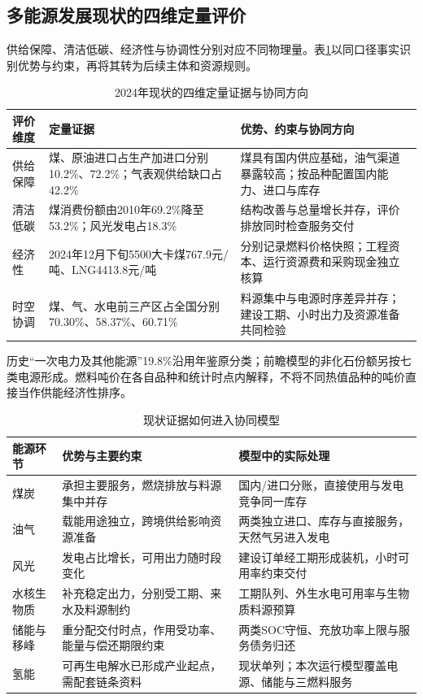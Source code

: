 \subsection{多能源发展现状的四维定量评价}
供给保障、清洁低碳、经济性与协调性分别对应不同物理量。表\ref{tab:current-four}以同口径事实识别优势与约束，再将其转为后续主体和资源规则。
\begin{table}[H]\centering\caption{2024年现状的四维定量证据与协同方向}\label{tab:current-four}
\begin{tabularx}{\linewidth}{p{.14\linewidth}p{.42\linewidth}X}\toprule
评价维度 & 定量证据 & 优势、约束与协同方向\\\midrule
供给保障 & 煤、原油进口占生产加进口分别10.2\%、72.2\%；气表观供给缺口占42.2\% & 煤具有国内供应基础，油气渠道暴露较高；按品种配置国内能力、进口与库存\\
清洁低碳 & 煤消费份额由2010年69.2\%降至53.2\%；风光发电占18.3\% & 结构改善与总量增长并存，评价排放同时检查服务交付\\
经济性 & 2024年12月下旬5500大卡煤767.9元/吨、LNG4413.8元/吨 & 分别记录燃料价格快照；工程资本、运行资源费和采购现金独立核算\\
时空协调 & 煤、气、水电前三产区占全国分别70.30\%、58.37\%、60.71\% & 料源集中与电源时序差异并存；建设工期、小时出力及资源准备共同检验\\
\bottomrule\end{tabularx}\end{table}
历史“一次电力及其他能源”19.8\%沿用年鉴原分类；前瞻模型的非化石份额另按七类电源形成。燃料吨价在各自品种和统计时点内解释，不将不同热值品种的吨价直接当作供能经济性排序。

\begin{table}[H]\centering\caption{现状证据如何进入协同模型}
\begin{tabularx}{\linewidth}{p{.14\linewidth}XX}\toprule
能源环节 & 优势与主要约束 & 模型中的实际处理\\\midrule
煤炭 & 承担主要服务，燃烧排放与料源集中并存 & 国内/进口分账，直接使用与发电竞争同一库存\\
油气 & 载能用途独立，跨境供给影响资源准备 & 两类独立进口、库存与直接服务，天然气另进入发电\\
风光 & 发电占比增长，可用出力随时段变化 & 建设订单经工期形成装机，小时可用率约束交付\\
水核生物质 & 补充稳定出力，分别受工期、来水及料源制约 & 工期队列、外生水电可用率与生物质料源预算\\
储能与移峰 & 重分配交付时点，作用受功率、能量与偿还期限约束 & 两类SOC守恒、充放功率上限与服务债务归还\\
氢能 & 可再生电解水已形成产业起点，需配套链条资料 & 现状单列；本次运行模型覆盖电源、储能与三燃料服务\\
\bottomrule\end{tabularx}\end{table}
\FloatBarrier
